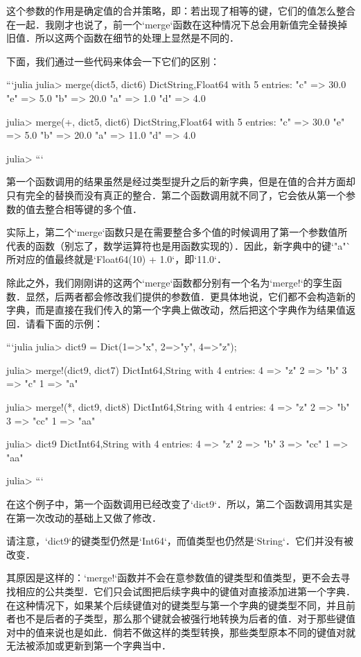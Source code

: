 这个参数的作用是确定值的合并策略，即：若出现了相等的键，它们的值怎么整合在一起．我刚才也说了，前一个`merge`函数在这种情况下总会用新值完全替换掉旧值．所以这两个函数在细节的处理上显然是不同的．

下面，我们通过一些代码来体会一下它们的区别：

```julia
julia> merge(dict5, dict6)
Dict{String,Float64} with 5 entries:
  "c" => 30.0
  "e" => 5.0
  "b" => 20.0
  "a" => 1.0
  "d" => 4.0

julia> merge(+, dict5, dict6)
Dict{String,Float64} with 5 entries:
  "c" => 30.0
  "e" => 5.0
  "b" => 20.0
  "a" => 11.0
  "d" => 4.0

julia> 
```

第一个函数调用的结果虽然是经过类型提升之后的新字典，但是在值的合并方面却只有完全的替换而没有真正的整合．第二个函数调用就不同了，它会依从第一个参数的值去整合相等键的多个值．

实际上，第二个`merge`函数只是在需要整合多个值的时候调用了第一个参数值所代表的函数（别忘了，数学运算符也是用函数实现的）．因此，新字典中的键`"a"`所对应的值最终就是`Float64(10) + 1.0`，即`11.0`．

除此之外，我们刚刚讲的这两个`merge`函数都分别有一个名为`merge!`的孪生函数．显然，后两者都会修改我们提供的参数值．更具体地说，它们都不会构造新的字典，而是直接在我们传入的第一个字典上做改动，然后把这个字典作为结果值返回．请看下面的示例：

```julia
julia> dict9 = Dict(1=>"x", 2=>"y", 4=>"z");

julia> merge!(dict9, dict7)
Dict{Int64,String} with 4 entries:
  4 => "z"
  2 => "b"
  3 => "c"
  1 => "a"

julia> merge!(*, dict9, dict8)
Dict{Int64,String} with 4 entries:
  4 => "z"
  2 => "b"
  3 => "cc"
  1 => "aa"

julia> dict9
Dict{Int64,String} with 4 entries:
  4 => "z"
  2 => "b"
  3 => "cc"
  1 => "aa"

julia> 
```

在这个例子中，第一个函数调用已经改变了`dict9`．所以，第二个函数调用其实是在第一次改动的基础上又做了修改．

请注意，`dict9`的键类型仍然是`Int64`，而值类型也仍然是`String`．它们并没有被改变．

其原因是这样的：`merge!`函数并不会在意参数值的键类型和值类型，更不会去寻找相应的公共类型．它们只会试图把后续字典中的键值对直接添加进第一个字典．在这种情况下，如果某个后续键值对的键类型与第一个字典的键类型不同，并且前者也不是后者的子类型，那么那个键就会被强行地转换为后者的值．对于那些键值对中的值来说也是如此．倘若不做这样的类型转换，那些类型原本不同的键值对就无法被添加或更新到第一个字典当中．

